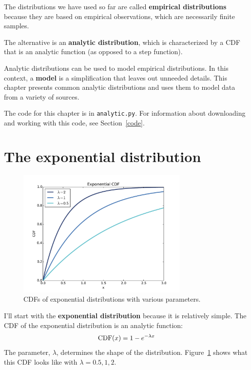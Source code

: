 \documentclass[12pt]{book}
\begin{document}
The distributions we have used so far are called {\bf empirical
  distributions} because they are based on empirical observations,
which are necessarily finite samples.

The alternative is an {\bf analytic distribution}, which is
characterized by a CDF that is an analytic function (as opposed to a
step function).

Analytic distributions can be used to model empirical distributions.
In this context, a {\bf model} is a simplification that leaves out
unneeded details.  This chapter presents common analytic distributions
and uses them to model data from a variety of sources.

The code for this chapter is in {\tt analytic.py}.  For information
about downloading and working with this code, see Section~\ref{code}.



\section{The exponential distribution}
\label{exponential}

\begin{figure}
\centerline{\includegraphics[height=2.5in]{figs/analytic_expo_cdf.pdf}}
\caption{CDFs of exponential distributions with various parameters.}
\label{analytic_expo_cdf}
\end{figure}

I'll start with the {\bf exponential distribution} because it is
relatively simple.  The CDF of the exponential distribution is an
analytic function:
%
\[ \mathrm{CDF}(x) = 1 - e^{-\lambda x} \]
%
The parameter, $\lambda$, determines the shape of the distribution.
Figure~\ref{analytic_expo_cdf} shows what this CDF looks like with
$\lambda = 0.5, 1, 2$.
\end{document}
